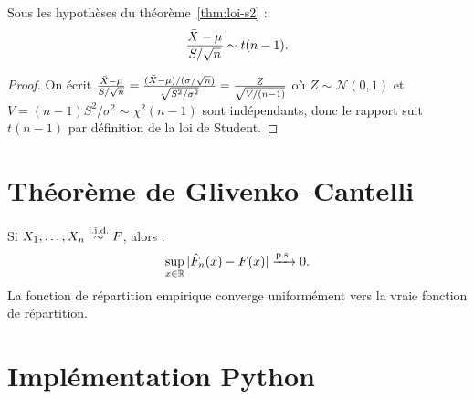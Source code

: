 \begin{corollaire}
Sous les hypoth\`eses du th\'eor\`eme~\ref{thm:loi-s2} :
\[
\frac{\bar{X}-\mu}{S/\sqrt{n}} \sim t(n-1).
\]
\end{corollaire}

\begin{proof}
On \'ecrit $\frac{\bar{X}-\mu}{S/\sqrt{n}} = \frac{(\bar{X}-\mu)/(\sigma/\sqrt{n})}{\sqrt{S^2/\sigma^2}} = \frac{Z}{\sqrt{V/(n-1)}}$ o\`u $Z\sim\mathcal{N}(0,1)$ et $V=(n-1)S^2/\sigma^2\sim\chi^2(n-1)$ sont ind\'ependants, donc le rapport suit $t(n-1)$ par d\'efinition de la loi de Student.
\end{proof}

\section{Th\'eor\`eme de Glivenko--Cantelli}

\begin{theoreme}
Si $X_1,\ldots,X_n\overset{\text{i.i.d.}}{\sim} F$, alors :
\[
\sup_{x\in\mathbb{R}}|\hat{F}_n(x)-F(x)| \xrightarrow{\text{p.s.}} 0.
\]
La fonction de r\'epartition empirique converge uniform\'ement vers la vraie fonction de r\'epartition.
\end{theoreme}

\section{Impl\'ementation Python}

